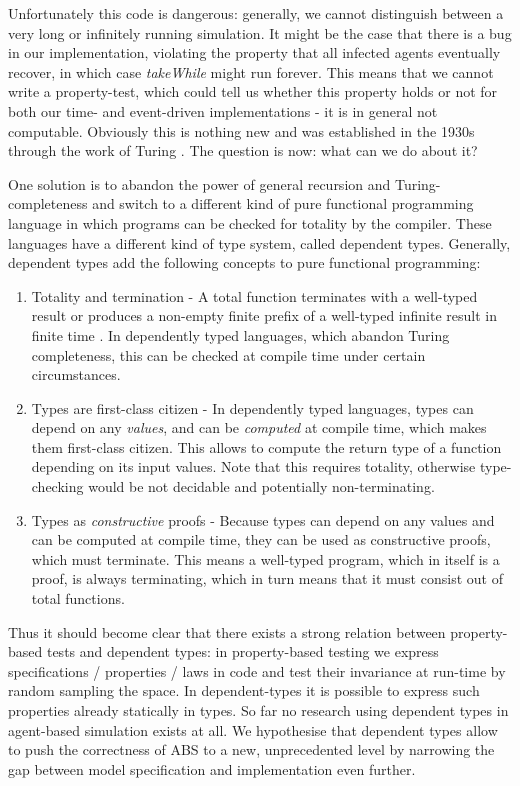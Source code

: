 Unfortunately this code is dangerous: generally, we cannot distinguish between a very long or infinitely running simulation. It might be the case that there is a bug in our implementation, violating the property that all infected agents eventually recover, in which case \textit{takeWhile} might run forever. This means that we cannot write a property-test, which could tell us whether this property holds or not for both our time- and event-driven implementations - it is in general not computable. Obviously this is nothing new and was established in the 1930s through the work of Turing \cite{turing_computable_1937}. The question is now: what can we do about it?

One solution is to abandon the power of general recursion and Turing-completeness and switch to a different kind of pure functional programming language in which programs can be checked for totality by the compiler. These languages have a different kind of type system, called dependent types. Generally, dependent types add the following concepts to pure functional programming:

\begin{enumerate}
	\item Totality and termination - A total function terminates with a well-typed result or produces a non-empty finite prefix of a well-typed infinite result in finite time \cite{brady_type-driven_2017}. In dependently typed languages, which abandon Turing completeness, this can be checked at compile time under certain circumstances.
	
	\item Types are first-class citizen - In dependently typed languages, types can depend on any \textit{values}, and can be \textit{computed} at compile time, which makes them first-class citizen. This allows to compute the return type of a function depending on its input values. Note that this requires totality, otherwise type-checking would be not decidable and potentially non-terminating.
	
	\item Types as \textit{constructive} proofs - Because types can depend on any values and can be computed at compile time, they can be used as constructive proofs, which must terminate. This means a well-typed program, which in itself is a proof, is always terminating, which in turn means that it must consist out of total functions.
\end{enumerate}

Thus it should become clear that there exists a strong relation between property-based tests and dependent types: in property-based testing we express specifications / properties / laws in code and test their invariance at run-time by random sampling the space. In dependent-types it is possible to express such properties already statically in types. So far no research using dependent types in agent-based simulation exists at all. We hypothesise that dependent types allow to push the correctness of ABS to a new, unprecedented level by narrowing the gap between model specification and implementation even further.

